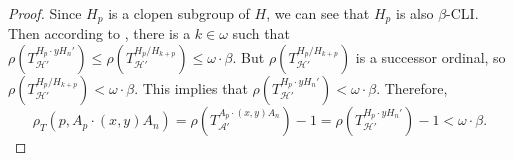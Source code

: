 \documentclass[11pt]{amsart}
\theoremstyle{definition}
\theoremstyle{remark}
\numberwithin{equation}{section}
\def\hier#1{$#1$-CLI}
\def\otr#1#2{T_{\mathcal{#1}}^{#2}}
\begin{document}
\begin{proof}
    Since $H_{p}$ is a clopen subgroup of $H$, we can see that $H_{p}$ is also \hier\beta. Then according to \cite[Lemma 3.11]{DingW}, there is a $k\in\omega$ such that $\rho(\otr{H'}{H_{p}\cdot yH_n'})\leq\rho(\otr{H'}{H_{p}/H_{k+p}})\leq\omega\cdot\beta$. But $\rho(\otr{H'}{H_{p}/H_{k+p}})$ is a successor ordinal, so $\rho(\otr{H'}{H_{p}/H_{k+p}})<\omega\cdot\beta$.
    This implies that $\rho(\otr{H'}{H_{p}\cdot yH_n'})<\omega\cdot\beta$. Therefore,
    $$\rho_T(p,A_p\cdot(x,y)A_n)=\rho(\otr{A'}{A_p\cdot(x,y)A_n})-1=\rho(\otr{H'}{H_p\cdot yH_n'})-1<\omega\cdot\beta.$$



\end{proof}
\end{document}
